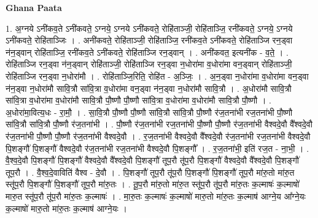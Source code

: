 \documentclass[17pt]{extarticle}
\begin{document}
\textbf{Ghana Paata } \newline

1. अ॒ग्नये ऽनी॑कव॒ते ऽनी॑कवते॒ ऽग्नये॒ ऽग्नये ऽनी॑कवते॒ रोहि॑ताञ्जी॒ रोहि॑ताञ्जि॒ रनी॑कवते॒ ऽग्नये॒ ऽग्नये ऽनी॑कवते॒ रोहि॑ताञ्जिः । . अनी॑कवते॒ रोहि॑ताञ्जी॒ रोहि॑ताञ्जि॒ रनी॑कव॒ते ऽनी॑कवते॒ रोहि॑ताञ्जि रन॒ड्वा न॑न॒ड्वान् रोहि॑ताञ्जि॒ रनी॑कव॒ते ऽनी॑कवते॒ रोहि॑ताञ्जि रन॒ड्वान् । . अनी॑कवत॒ इत्यनी॑क - व॒ते॒ । . रोहि॑ताञ्जि रन॒ड्वा न॑न॒ड्वान् रोहि॑ताञ्जी॒ रोहि॑ताञ्जि रन॒ड्वा न॒धोरा॑मा व॒धोरा॑मा वन॒ड्वान् रोहि॑ताञ्जी॒ रोहि॑ताञ्जि रन॒ड्वा न॒धोरा॑मौ । . रोहि॑ताञ्जि॒रिति॒ रोहि॑त - अ॒ञ्जिः॒ । . अ॒न॒ड्वा न॒धोरा॑मा व॒धोरा॑मा वन॒ड्वा न॑न॒ड्वा न॒धोरा॑मौ सावि॒त्रौ सा॑वि॒त्रा व॒धोरा॑मा वन॒ड्वा न॑न॒ड्वा न॒धोरा॑मौ सावि॒त्रौ । . अ॒धोरा॑मौ सावि॒त्रौ सा॑वि॒त्रा व॒धोरा॑मा व॒धोरा॑मौ सावि॒त्रौ पौ॒ष्णौ पौ॒ष्णौ सा॑वि॒त्रा व॒धोरा॑मा व॒धोरा॑मौ सावि॒त्रौ पौ॒ष्णौ । . अ॒धोरा॑मा॒वित्य॒धः - रा॒मौ॒ । . सा॒वि॒त्रौ पौ॒ष्णौ पौ॒ष्णौ सा॑वि॒त्रौ सा॑वि॒त्रौ पौ॒ष्णौ र॑ज॒तना॑भी रज॒तना॑भी पौ॒ष्णौ सा॑वि॒त्रौ सा॑वि॒त्रौ पौ॒ष्णौ र॑ज॒तना॑भी । . पौ॒ष्णौ र॑ज॒तना॑भी रज॒तना॑भी पौ॒ष्णौ पौ॒ष्णौ र॑ज॒तना॑भी वैश्वदे॒वौ वै᳚श्वदे॒वौ र॑ज॒तना॑भी पौ॒ष्णौ पौ॒ष्णौ र॑ज॒तना॑भी वैश्वदे॒वौ । . र॒ज॒तना॑भी वैश्वदे॒वौ वै᳚श्वदे॒वौ र॑ज॒तना॑भी रज॒तना॑भी वैश्वदे॒वौ पि॒शङ्गौ॑ पि॒शङ्गौ॑ वैश्वदे॒वौ र॑ज॒तना॑भी रज॒तना॑भी वैश्वदे॒वौ पि॒शङ्गौ᳚ । . र॒ज॒तना॑भी॒ इति॑ रज॒त - ना॒भी॒ । . वै॒श्व॒दे॒वौ पि॒शङ्गौ॑ पि॒शङ्गौ॑ वैश्वदे॒वौ वै᳚श्वदे॒वौ पि॒शङ्गौ॑ तूप॒रौ तू॑प॒रौ पि॒शङ्गौ॑ वैश्वदे॒वौ वै᳚श्वदे॒वौ पि॒शङ्गौ॑ तूप॒रौ । . वै॒श्व॒दे॒वाविति॑ वैश्व - दे॒वौ । . पि॒शङ्गौ॑ तूप॒रौ तू॑प॒रौ पि॒शङ्गौ॑ पि॒शङ्गौ॑ तूप॒रौ मा॑रु॒तो मा॑रु॒त स्तू॑प॒रौ पि॒शङ्गौ॑ पि॒शङ्गौ॑ तूप॒रौ मा॑रु॒तः । . तू॒प॒रौ मा॑रु॒तो मा॑रु॒त स्तू॑प॒रौ तू॑प॒रौ मा॑रु॒तः क॒ल्माषः॑ क॒ल्माषो॑ मारु॒त स्तू॑प॒रौ तू॑प॒रौ मा॑रु॒तः क॒ल्माषः॑ । . मा॒रु॒तः क॒ल्माषः॑ क॒ल्माषो॑ मारु॒तो मा॑रु॒तः क॒ल्माष॑ आग्ने॒य आ᳚ग्ने॒यः क॒ल्माषो॑ मारु॒तो मा॑रु॒तः क॒ल्माष॑ आग्ने॒यः । \newline
\end{document}
